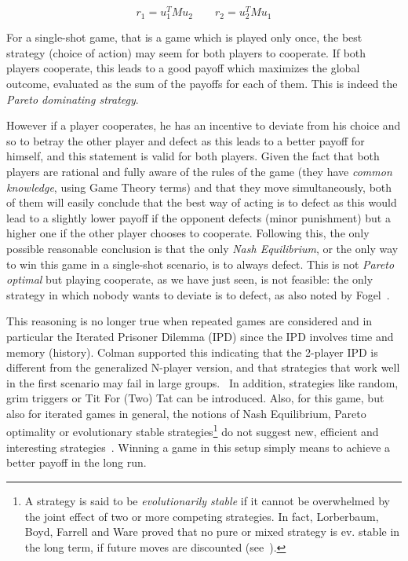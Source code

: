 \documentclass[journal,a4paper,10pt,twoside]{IEEEtran} %
\begin{document}
$$
r_1 = u_1^T M u_2
\quad
\quad
r_2 = u_2^T M u_1
$$

For a single-shot game, that is a game which is played only once, the best strategy (choice of action) may seem for both players to cooperate. If both players cooperate, this leads to a good payoff which maximizes the global outcome, evaluated as the sum of the payoffs for each of them. This is indeed the \textit{Pareto dominating strategy}.

However if a player cooperates, he has an incentive to deviate from his choice and so to betray the other player and defect as this leads to a better payoff for himself, and this statement is valid for both players. 
Given the fact that both players are rational and fully aware of the rules of the game (they have \textit{common knowledge}, using Game Theory terms) and that they move simultaneously, both of them will easily conclude that the best way of acting is to defect as this would lead to a slightly lower payoff if the opponent defects (minor punishment) but a higher one if the other player chooses to cooperate.
Following this, the only possible reasonable conclusion is that the only \textit{Nash Equilibrium}, or the only way to win this game in a single-shot scenario, is to always defect.
This is not \textit{Pareto optimal} but playing cooperate, as we have just seen, is not feasible: the only strategy in which nobody wants to deviate is to defect, as also noted by Fogel~\cite{fogelEvolvingBehaviors}.

This reasoning is no longer true when repeated games are considered and in particular the Iterated Prisoner Dilemma (IPD) since the IPD involves time and memory (history).
Colman supported this indicating that the 2-player IPD is different from the generalized N-player version, and that strategies that work well in the first scenario may fail in large groups.~\cite{yao1994experimental}
In addition, strategies like random, grim triggers or Tit For (Two) Tat can be introduced.
Also, for this game, but also for iterated games in general, the notions of Nash Equilibrium, Pareto optimality or evolutionary stable strategies\footnote{A strategy is said to be \textit{evolutionarily stable} if it cannot be overwhelmed by the joint effect of two or more competing strategies. In fact, Lorberbaum, Boyd, Farrell and Ware proved that no pure or mixed strategy is ev. stable in the long term, if future moves are discounted (see~\cite{lorb94}).} do not suggest new, efficient and interesting strategies~\cite{mathieu2017}.
Winning a game in this setup simply means to achieve a better payoff in the long run.
\end{document}
